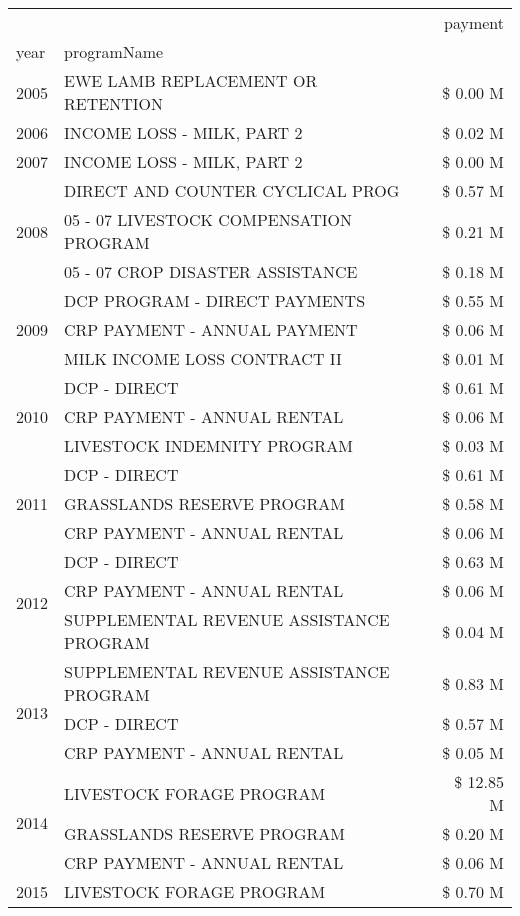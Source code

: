 \begin{tabular}{llr}
\toprule
 &  & payment \\
year & programName &  \\
\midrule
2005 & EWE LAMB REPLACEMENT OR RETENTION & \$ 0.00 M \\
\cline{1-3}
2006 & INCOME LOSS - MILK, PART 2 & \$ 0.02 M \\
\cline{1-3}
2007 & INCOME LOSS - MILK, PART 2 & \$ 0.00 M \\
\cline{1-3}
\multirow[t]{3}{*}{2008} & DIRECT AND COUNTER CYCLICAL PROG & \$ 0.57 M \\
 & 05 - 07 LIVESTOCK COMPENSATION PROGRAM & \$ 0.21 M \\
 & 05 - 07 CROP DISASTER ASSISTANCE & \$ 0.18 M \\
\cline{1-3}
\multirow[t]{3}{*}{2009} & DCP PROGRAM - DIRECT PAYMENTS & \$ 0.55 M \\
 & CRP PAYMENT - ANNUAL PAYMENT & \$ 0.06 M \\
 & MILK INCOME LOSS CONTRACT II & \$ 0.01 M \\
\cline{1-3}
\multirow[t]{3}{*}{2010} & DCP - DIRECT & \$ 0.61 M \\
 & CRP PAYMENT - ANNUAL RENTAL & \$ 0.06 M \\
 & LIVESTOCK INDEMNITY PROGRAM & \$ 0.03 M \\
\cline{1-3}
\multirow[t]{3}{*}{2011} & DCP - DIRECT & \$ 0.61 M \\
 & GRASSLANDS RESERVE PROGRAM & \$ 0.58 M \\
 & CRP PAYMENT - ANNUAL RENTAL & \$ 0.06 M \\
\cline{1-3}
\multirow[t]{3}{*}{2012} & DCP - DIRECT & \$ 0.63 M \\
 & CRP PAYMENT - ANNUAL RENTAL & \$ 0.06 M \\
 & SUPPLEMENTAL REVENUE ASSISTANCE PROGRAM & \$ 0.04 M \\
\cline{1-3}
\multirow[t]{3}{*}{2013} & SUPPLEMENTAL REVENUE ASSISTANCE PROGRAM & \$ 0.83 M \\
 & DCP - DIRECT & \$ 0.57 M \\
 & CRP PAYMENT - ANNUAL RENTAL & \$ 0.05 M \\
\cline{1-3}
\multirow[t]{3}{*}{2014} & LIVESTOCK FORAGE PROGRAM & \$ 12.85 M \\
 & GRASSLANDS RESERVE PROGRAM & \$ 0.20 M \\
 & CRP PAYMENT - ANNUAL RENTAL & \$ 0.06 M \\
\cline{1-3}
\multirow[t]{3}{*}{2015} & LIVESTOCK FORAGE PROGRAM & \$ 0.70 M \\

\end{tabular}
